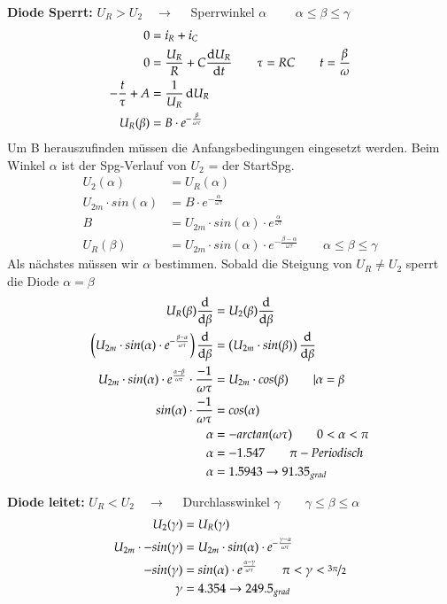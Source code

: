 \newline
\textbf{Diode Sperrt:} $ U_R > U_2 \quad \rightarrow \quad $ Sperrwinkel $\alpha$ $\qquad \alpha \leq \beta \leq \gamma$
\begin{align*}
     0 & = i_R + i_C \\
     0 & = \frac{U_R}{R}+ C \frac{\mathop{}\!\mathrm{d} U_R}{\mathop{}\!\mathrm{d} t} \qquad \tau = RC \qquad t = \frac{\beta}{\omega}\\
     - \frac{t}{\tau} + A & = \frac{1}{U_R} \mathop{}\!\mathrm{d} U_R \\
     U_R(\beta) & = B \cdot e^{-\frac{\beta}{\omega \tau}}
     \end{align*}
 Um B herauszufinden müssen die Anfangsbedingungen eingesetzt werden.\newline 
 Beim Winkel $\alpha$ ist der Spg-Verlauf von $U_2$ = der StartSpg. 
     \begin{align*}
     U_2(\alpha) & =U_R(\alpha)\\
     U_{2m} \cdot sin(\alpha) & = B \cdot e^{-\frac{\alpha}{\omega \tau}}\\
     B & = U_{2m} \cdot sin(\alpha) \cdot e^{\frac{\alpha}{\omega \tau}}\\
     U_R(\beta) & =  U_{2m} \cdot sin(\alpha) \cdot e^{-\frac{\beta - \alpha}{\omega \tau}} \qquad \alpha \leq \beta \leq \gamma       
\end{align*}
Als nächstes müssen wir $\alpha$ bestimmen. Sobald die Steigung von $U_R \neq U_{2}$ sperrt die Diode $\alpha = \beta$
\begin{align*}
    U_R(\beta) \frac{\diff}{\diff \beta} & = U_2(\beta) \frac{\diff}{\diff \beta}\\
    \left( U_{2m} \cdot sin(\alpha) \cdot e^{-\frac{\beta - \alpha}{\omega \tau}}\right)\frac{\diff}{\diff \beta} & = \left( U_{2m} \cdot sin(\beta)\right)\frac{\diff}{\diff \beta}\\
    U_{2m}\cdot sin(\alpha)\cdot e^{\frac{\alpha - \beta}{\omega \tau}}\cdot \frac{-1}{\omega \tau} &= U_{2m}\cdot cos(\beta) \qquad | \alpha = \beta\\
    sin(\alpha)\cdot \frac{-1}{\omega \tau} &= cos(\alpha)\\
    \alpha & = -arctan(\omega \tau) \qquad 0 < \alpha < \pi\\
    \alpha & = -1.547 \qquad \pi -Periodisch\\
    \alpha & = 1.5943 \rightarrow 91.35_{grad}
\end{align*}

\textbf{Diode leitet:} $ U_R < U_2 \quad \rightarrow \quad $ Durchlasswinkel $\gamma \qquad \gamma \leq \beta \leq \alpha$
\begin{align*}
    U_2(\gamma) & = U_R(\gamma)\\
    U_{2m}\cdot -sin(\gamma) & = U_{2m} \cdot sin(\alpha) \cdot e^{-\frac{\gamma - \alpha}{\omega \tau}}\\
    -sin(\gamma) & = sin(\alpha) \cdot e^{\frac{\alpha - \gamma}{\omega \tau}} \qquad \pi < \gamma < \nicefrac{3\pi}{2}\\
    \gamma & = 4.354 \rightarrow 249.5_{grad}
\end{align*}

